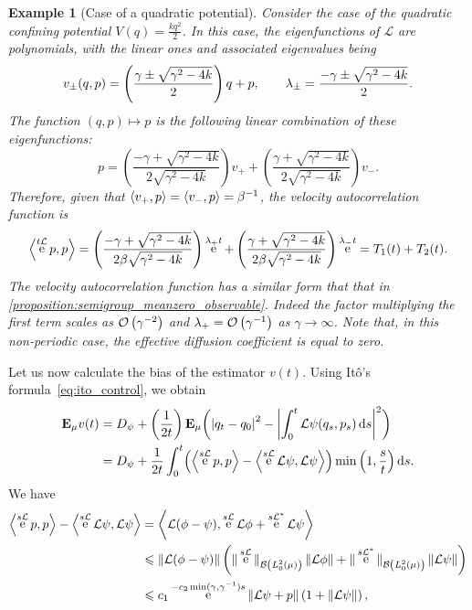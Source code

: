 \documentclass[11pt,a4paper]{article}
\DeclareMathOperator{\e}{e}
\newcommand{\expect}[0]{\mathbf{E}}
\renewcommand{\d}{\mathrm d}
\theoremstyle{plain}
\newtheorem{example}{Example}[section]
\numberwithin{equation}{section}
\renewcommand{\leq}{\leqslant}
\begin{document}
\begin{example}
    [Case of a quadratic potential]
    \label{example:quadratic}
    Consider the case of the quadratic confining potential $V(q) = \frac{k q^2}{2}$.
    In this case, the eigenfunctions of $\mathcal L$ are polynomials,
    with the linear ones and associated eigenvalues being
    \[
        v_{\pm}(q, p) =
        \left( \frac{\gamma \pm \sqrt{\gamma^2 - 4k}}{2} \right) q + p, \\
        \qquad
        \lambda_{\pm} = \frac{- \gamma \pm \sqrt{\gamma^2 - 4k}}{2}.
    \]
    The function $(q, p) \mapsto p$ is the following linear combination of these eigenfunctions:
    \[
        p =
        \left( \frac{-\gamma + \sqrt{\gamma^2 - 4k}}{2 \sqrt{\gamma^2 - 4k}} \right) v_+
        + \left( \frac{\gamma + \sqrt{\gamma^2 - 4k}}{2 \sqrt{\gamma^2 - 4k}} \right) v_-.
    \]
    Therefore, given that $\ip{v_+}{p} = \ip{v_-}{p} = \beta^{-1}$,
    the velocity autocorrelation function is
    \[
        \ip{\e^{t \mathcal L}p}{p} =
        \left( \frac{-\gamma + \sqrt{\gamma^2 - 4k}}{2 \beta \sqrt{\gamma^2 - 4k}} \right) \e^{\lambda_+ t} +
        \left( \frac{\gamma + \sqrt{\gamma^2 - 4k}}{2 \beta \sqrt{\gamma^2 - 4k}} \right) \e^{\lambda_- t} = T_1(t) + T_2(t).
    \]
    The velocity autocorrelation function has a similar form that that in \cref{proposition:semigroup_meanzero_observable}.
    Indeed the factor multiplying the first term scales as $\bigo{\gamma^{-2}}$
    and $\lambda_+ = \bigo {\gamma^{-1}}$ as $\gamma \to \infty$.
    Note that, in this non-periodic case, the effective diffusion coefficient is equal to zero.
\end{example}

Let us now calculate the bias of the estimator $v(t)$.
Using Itô's formula~\eqref{eq:ito_control},
we obtain
\begin{align*}
    \expect_{\mu} v(t)
    &= D_{\psi} + \left( \frac{1}{2t} \right) \expect_{\mu} \biggl( \abs{q_t - q_0}^2 - \biggl| \int_0^t {\mathcal L \psi}(q_s, p_s) \, \d s \biggr|^2 \biggr) \\
    &= D_{\psi} +  \frac{1}{2t}  \int_{0}^{t} \Bigl( \ip{\e^{s \mathcal L}p}{p} - \ip{\e^{s \mathcal L} \mathcal L \psi}{\mathcal L \psi} \Bigr) \min\left(1, \frac{s}{t}\right) \d s.
\end{align*}
We have
\begin{align*}
    \ip{\e^{s \mathcal L}p}{p} - \ip{\e^{s \mathcal L} \mathcal L \psi}{\mathcal L \psi}
    &= \ip{\mathcal L (\phi - \psi)}{\e^{s \mathcal L} \mathcal L \phi + \e^{s \mathcal L^*} \mathcal  L\psi} \\
    &\leq \norm{\mathcal L(\phi - \psi)}
    \left( \norm*{\e^{s \mathcal L}}[\mathcal B\left(L^2_0(\mu) \right)] \norm{\mathcal L \phi} + \norm*{\e^{s \mathcal L^*}}[\mathcal B\left(L^2_0(\mu) \right)] \norm{\mathcal L \psi} \right) \\
    &\leq c_1 \e^{-c_2 \min(\gamma, \gamma^{-1}) s} \norm{\mathcal L\psi + p}  \left(1 + \norm{\mathcal L \psi} \right),
\end{align*}
\end{document}
